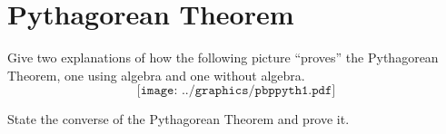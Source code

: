 \newpage

\section{Pythagorean Theorem}

\begin{prob}
Give two explanations of how the following picture ``proves''
  the Pythagorean Theorem, one using algebra and one without algebra. 
\[
\texttt{[image: ../graphics/pbppyth1.pdf]}
\]

\end{prob}

\vfill

\begin{prob}
State the converse of the Pythagorean Theorem and prove it.  
\end{prob}
\vfill
